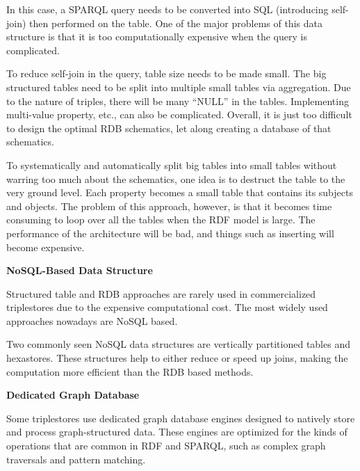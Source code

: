 In this case, a SPARQL query needs to be converted into SQL (introducing self-join) then performed on the table. One of the major problems of this data structure is that it is too computationally expensive when the query is complicated.

To reduce self-join in the query, table size needs to be made small. The big structured tables need to be split into multiple small tables via aggregation. Due to the nature of triples, there will be many ``NULL'' in the tables. Implementing multi-value property, etc., can also be complicated. Overall, it is just too difficult to design the optimal RDB schematics, let along creating a database of that schematics.

To systematically and automatically split big tables into small tables without warring too much about the schematics, one idea is to destruct the table to the very ground level. Each property becomes a small table that contains its subjects and objects. The problem of this approach, however, is that it becomes time consuming to loop over all the tables when the RDF model is large. The performance of the architecture will be bad, and things such as inserting will become expensive.

\vspace{0.1in}
\noindent \textbf{NoSQL-Based Data Structure}
\vspace{0.1in}

Structured table and RDB approaches are rarely used in commercialized triplestores due to the expensive computational cost. The most widely used approaches nowadays are NoSQL based.

Two commonly seen NoSQL data structures are vertically partitioned tables and hexastores. These structures help to either reduce or speed up joins, making the computation more efficient than the RDB based methods.

\vspace{0.1in}
\noindent \textbf{Dedicated Graph Database}
\vspace{0.1in}

Some triplestores use dedicated graph database engines designed to natively store and process graph-structured data. These engines are optimized for the kinds of operations that are common in RDF and SPARQL, such as complex graph traversals and pattern matching.
